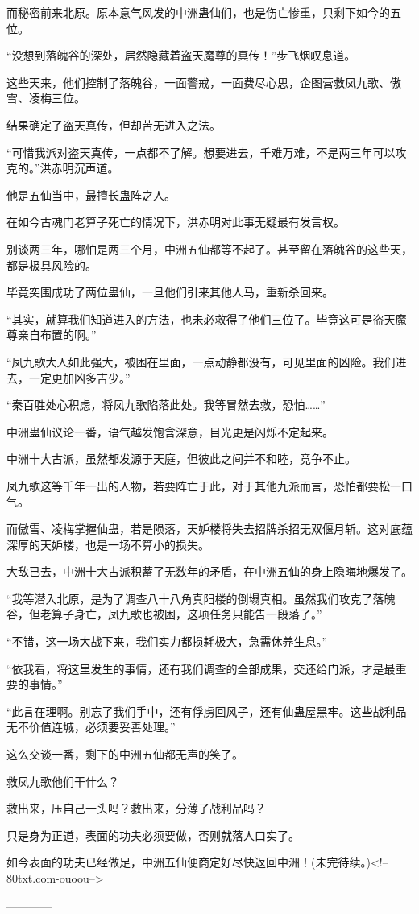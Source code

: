 \begin{this_body}
而秘密前来北原。原本意气风发的中洲蛊仙们，也是伤亡惨重，只剩下如今的五位。

“没想到落魄谷的深处，居然隐藏着盗天魔尊的真传！”步飞烟叹息道。

这些天来，他们控制了落魄谷，一面警戒，一面费尽心思，企图营救凤九歌、傲雪、凌梅三位。

结果确定了盗天真传，但却苦无进入之法。

“可惜我派对盗天真传，一点都不了解。想要进去，千难万难，不是两三年可以攻克的。”洪赤明沉声道。

他是五仙当中，最擅长蛊阵之人。

在如今古魂门老算子死亡的情况下，洪赤明对此事无疑最有发言权。

别谈两三年，哪怕是两三个月，中洲五仙都等不起了。甚至留在落魄谷的这些天，都是极具风险的。

毕竟突围成功了两位蛊仙，一旦他们引来其他人马，重新杀回来。

“其实，就算我们知道进入的方法，也未必救得了他们三位了。毕竟这可是盗天魔尊亲自布置的啊。”

“凤九歌大人如此强大，被困在里面，一点动静都没有，可见里面的凶险。我们进去，一定更加凶多吉少。”

“秦百胜处心积虑，将凤九歌陷落此处。我等冒然去救，恐怕……”

中洲蛊仙议论一番，语气越发饱含深意，目光更是闪烁不定起来。

中洲十大古派，虽然都发源于天庭，但彼此之间并不和睦，竞争不止。

凤九歌这等千年一出的人物，若要阵亡于此，对于其他九派而言，恐怕都要松一口气。

而傲雪、凌梅掌握仙蛊，若是陨落，天妒楼将失去招牌杀招无双偃月斩。这对底蕴深厚的天妒楼，也是一场不算小的损失。

大敌已去，中洲十大古派积蓄了无数年的矛盾，在中洲五仙的身上隐晦地爆发了。

“我等潜入北原，是为了调查八十八角真阳楼的倒塌真相。虽然我们攻克了落魄谷，但老算子身亡，凤九歌也被困，这项任务只能告一段落了。”

“不错，这一场大战下来，我们实力都损耗极大，急需休养生息。”

“依我看，将这里发生的事情，还有我们调查的全部成果，交还给门派，才是最重要的事情。”

“此言在理啊。别忘了我们手中，还有俘虏回风子，还有仙蛊屋黑牢。这些战利品无不价值连城，必须要妥善处理。”

这么交谈一番，剩下的中洲五仙都无声的笑了。

救凤九歌他们干什么？

救出来，压自己一头吗？救出来，分薄了战利品吗？

只是身为正道，表面的功夫必须要做，否则就落人口实了。

如今表面的功夫已经做足，中洲五仙便商定好尽快返回中洲！(未完待续。)<!--80txt.com-ouoou-->

------------

\end{this_body}

